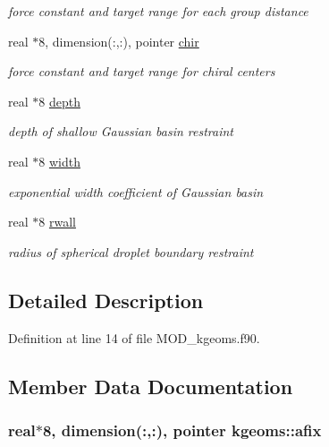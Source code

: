 \begin{DoxyCompactItemize}
\begin{DoxyCompactList}\small\item\em force constant and target range for each group distance \end{DoxyCompactList}\item 
real $\ast$8, dimension(\-:,\-:), pointer \hyperlink{classkgeoms_abd91d0c33a114e39b4c6af7687637f5f}{chir}
\begin{DoxyCompactList}\small\item\em force constant and target range for chiral centers \end{DoxyCompactList}\item 
real $\ast$8 \hyperlink{classkgeoms_a326e1f409617ba95423a00b96cc7f133}{depth}
\begin{DoxyCompactList}\small\item\em depth of shallow Gaussian basin restraint \end{DoxyCompactList}\item 
real $\ast$8 \hyperlink{classkgeoms_a2299a136a0ecee308c9a9eb100dbcdc9}{width}
\begin{DoxyCompactList}\small\item\em exponential width coefficient of Gaussian basin \end{DoxyCompactList}\item 
real $\ast$8 \hyperlink{classkgeoms_a8476e0216eae03be2043d5cbd501a27a}{rwall}
\begin{DoxyCompactList}\small\item\em radius of spherical droplet boundary restraint \end{DoxyCompactList}\end{DoxyCompactItemize}


\subsection{Detailed Description}


Definition at line 14 of file M\-O\-D\-\_\-kgeoms.\-f90.



\subsection{Member Data Documentation}
\hypertarget{classkgeoms_a577094db0304329d243bc55bc9cec50f}{
\subsubsection[{afix}]{\setlength{\rightskip}{0pt plus 5cm}real$\ast$8, dimension(\-:,\-:), pointer kgeoms\-::afix}}\label{classkgeoms_a577094db0304329d243bc55bc9cec50f}


